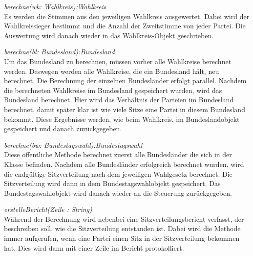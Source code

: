 \documentclass[12pt,a4paper,titlepage]{article}
\newcommand{\mymo}{\fontfamily{pcr}\selectfont \textit}
\begin{document}
\begin{description}
\item {\mymo{berechne(wk: Wahlkreis):Wahlkreis}} \\
Es werden die Stimmen aus den jeweiligen Wahlkreis ausgewertet. Dabei wird der Wahlkreissieger bestimmt und die Anzahl der Zweitstimme von jeder Partei. Die Auswertung wird danach wieder in das Wahlkreis-Objekt geschrieben.
\item {\mymo{berechne(bl: Bundesland):Bundesland}} \\
Um das Bundesland zu berechnen, müssen vorher alle Wahlkreise berechnet werden. Deswegen werden alle Wahlkreise, die ein Bundesland hält, neu berechnet. Die Berechnung der einzelnen Bundesländer erfolgt parallel. Nachdem die berechneten Wahlkreise im Bundesland gespeichert wurden, wird das Bundesland berechnet. Hier wird das Verhältnis der Parteien im Bundesland berechnet, damit später klar ist wie viele Sitze eine Partei in diesem Bundesland bekommt. Diese Ergebnisse werden, wie beim Wahlkreis, im Bundeslandobjekt gespeichert und danach zurückgegeben. 
\item {\mymo{berechne(bw: Bundestagswahl):Bundestagswahl}} \\
Diese öffentliche Methode berechnet zuerst alle Bundesländer die sich in der Klasse befinden. Nachdem alle Bundesländer erfolgreich berechnet wurden, wird die endgültige Sitzverteilung nach dem jeweiligen Wahlgesetz berechnet. Die Sitzverteilung wird dann in dem Bundestagswahlobjekt gespeichert. Das Bundestagswahlobjekt wird danach wieder an die Steuerung zurückgegeben.
\item {\mymo{erstelleBericht(Zeile : String)}} \\
Während der Berechnung wird nebenbei eine Sitzverteilungsbericht verfasst, der beschreiben soll, wie die Sitzverteilung entstanden ist. Dabei wird die Methode immer aufgerufen, wenn eine Partei einen Sitz in der Sitzverteilung bekommen hat. Dies wird dann mit einer Zeile im Bericht protokolliert.
\end{description} 

\newpage
\end{document}
